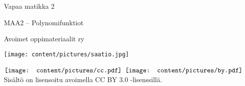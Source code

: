
\vspace*{3cm}

\begin{center}
    \sffamily
    \begin{doublespace}
        \begin{Huge}
            Vapaa matikka 2 \\
        \end{Huge}
        \vspace*{1cm}
        \begin{LARGE}
            MAA2 -- Polynomifunktiot
        \end{LARGE}

        \vfill

        \begin{LARGE}
            Avoimet oppimateriaalit ry \\
        \end{LARGE}
        \vspace*{1cm}
        \texttt{[image: content/pictures/saatio.jpg]}
    \end{doublespace}
\end{center}

\vspace*{3cm}

\begin{flushright}
    \sffamily
    $\vcenter{\hbox{\texttt{[image: content/pictures/cc.pdf]}}}$
    $\vcenter{\hbox{\texttt{[image: content/pictures/by.pdf]}}}$
    Sisältö on lisensoitu avoimella CC BY 3.0 -lisenssillä.
\end{flushright}
